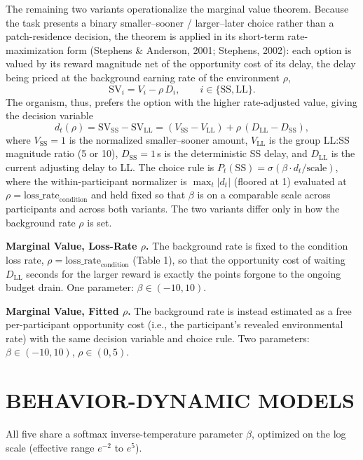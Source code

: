 \documentclass[12pt]{article}
\begin{document}
\indent The remaining two variants operationalize the marginal value theorem. Because the task presents a binary smaller--sooner / larger--later choice rather than a patch-residence decision, the theorem is applied in its short-term rate-maximization form (Stephens \& Anderson, 2001; Stephens, 2002): each option is valued by its reward magnitude net of the opportunity cost of its delay, the delay being priced at the background earning rate of the environment $\rho$,
\[
\mathrm{SV}_i = V_i - \rho \, D_i, \qquad i \in \{\mathrm{SS}, \mathrm{LL}\}.
\]
The organism, thus, prefers the option with the higher rate-adjusted value, giving the decision variable
\[
d_t(\rho) = \mathrm{SV}_{\mathrm{SS}} - \mathrm{SV}_{\mathrm{LL}} = (V_{\mathrm{SS}} - V_{\mathrm{LL}}) + \rho \, (D_{\mathrm{LL}} - D_{\mathrm{SS}}),
\]
where $V_{\mathrm{SS}} = 1$ is the normalized smaller--sooner amount, $V_{\mathrm{LL}}$ is the group LL:SS magnitude ratio (5 or 10), $D_{\mathrm{SS}} = 1$\,s is the deterministic SS delay, and $D_{\mathrm{LL}}$ is the current adjusting delay to LL. The choice rule is $P_t(\mathrm{SS}) = \sigma(\beta \cdot d_t / \mathrm{scale})$, where the within-participant normalizer is $\max_t |d_t|$ (floored at 1) evaluated at $\rho = \mathrm{loss\_rate}_{\text{condition}}$ and held fixed so that $\beta$ is on a comparable scale across participants and across both variants. The two variants differ only in how the background rate $\rho$ is set.

\textbf{Marginal Value, Loss-Rate $\rho$.} The background rate is fixed to the condition loss rate, $\rho = \mathrm{loss\_rate}_{\text{condition}}$ (Table 1), so that the opportunity cost of waiting $D_{\mathrm{LL}}$ seconds for the larger reward is exactly the points forgone to the ongoing budget drain. One parameter: $\beta \in (-10, 10)$.

\textbf{Marginal Value, Fitted $\rho$.} The background rate is instead estimated as a free per-participant opportunity cost (i.e., the participant's revealed environmental rate) with the same decision variable and choice rule. Two parameters: $\beta \in (-10, 10)$, $\rho \in (0, 5)$.

\section*{BEHAVIOR-DYNAMIC MODELS}

\indent All five share a softmax inverse-temperature parameter $\beta$, optimized on the log scale (effective range $e^{-2}$ to $e^{5}$).
\end{document}
